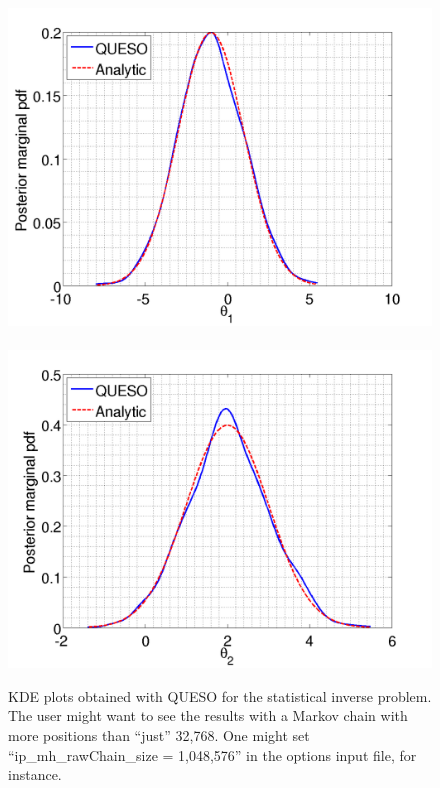 \begin{figure}[h!]
\centerline{
\includegraphics[scale=0.30,clip=true,viewport=0.0in 0.0in 8.0in 7.0in]{figs/paper_plot3}
$~$
\includegraphics[scale=0.30,clip=true,viewport=0.0in 0.0in 8.0in 7.0in]{figs/paper_plot4}
}
\caption{
KDE plots obtained with QUESO for the statistical inverse problem.
The user might want to see the results with a Markov chain with more positions than ``just'' 32,768. One might set ``ip\_mh\_rawChain\_size = 1,048,576'' in the options input file, for instance.
}
\label{fig-sip-hist-kde-plots}
\end{figure}


